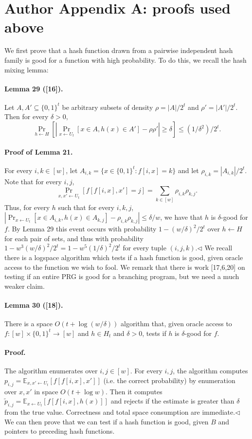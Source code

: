 \documentclass[10pt,a4paper]{article}
\begin{document}
\section*{Author Appendix A: proofs used above}
We first prove that a hash function drawn from a pairwise independent hash family is good for a function with high probability. To do this, we recall the hash mixing lemma:
\paragraph{Lemma 29 ([16]).} Let $A,A'\subseteq\{0,1\}^t$ be arbitrary subsets of density $\rho=|A|/2^t$ and $\rho'=|A'|/2^t$. Then for every $\delta>0$,
\[\Pr_{h\leftarrow H}\left[\left|\Pr_{x\leftarrow U_t}[x\in A,h(x)\in A']-\rho\rho'\right|\geq\delta\right]\leq(1/\delta^2)/2^t.\]
\paragraph{Proof of Lemma 21.} For every $i,k\in[w]$, let $A_{i,k}=\{x\in\{0,1\}^t:f[i,x]=k\}$ and let $\rho_{i,k}=|A_{i,k}|/2^t$. Note that for every $i,j$,
\[\Pr_{x,x'\leftarrow U_t}[f[f[i,x],x']=j]=\sum_{k\in[w]}\rho_{i,k}\rho_{k,j}.\]
Thus, for every $h$ such that for every $i,k,j$, $|\Pr_{x\leftarrow U_t}[x\in A_{i,k},h(x)\in A_{k,j}]-\rho_{i,k}\rho_{k,j}|\leq\delta/w$, we have that $h$ is $\delta$-good for $f$. By Lemma 29 this event occurs with probability $1-(w/\delta)^2/2^t$ over $h\leftarrow H$ for each pair of sets, and thus with probability $1-w^3(w/\delta)^2/2^t=1-w^5(1/\delta)^2/2^t$ for every tuple $(i,j,k)$.\hfill$\triangleleft$
We recall there is a logspace algorithm which tests if a hash function is good, given oracle access to the function we wish to fool. We remark that there is work [17,6,20] on testing if an entire PRG is good for a branching program, but we need a much weaker claim.
\paragraph{Lemma 30 ([18]).} There is a space $O(t+\log(w/\delta))$ algorithm that, given oracle access to $f:[w]\times\{0,1\}^t\to[w]$ and $h\in H_t$ and $\delta>0$, tests if $h$ is $\delta$-good for $f$.
\paragraph{Proof.} The algorithm enumerates over $i,j\in[w]$. For every $i,j$, the algorithm computes $p_{i,j}=\mathbb E_{x,x'\leftarrow U_t}[f[f[i,x],x']]$ (i.e. the correct probability) by enumeration over $x,x'$ in space $O(t+\log w)$. Then it computes $\widetilde p_{i,j}=\mathbb E_{x\leftarrow U_t}[f[f[i,x],h(x)]]$ and rejects if the estimate is greater than $\delta$ from the true value. Correctness and total space consumption are immediate.\hfill$\triangleleft$
We can then prove that we can test if a hash function is good, given $B$ and pointers to preceding hash functions.
\end{document}
